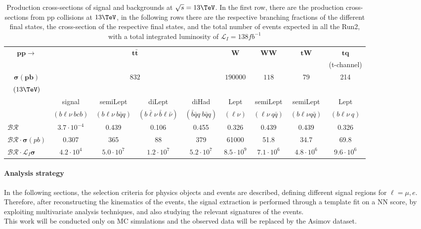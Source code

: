 \begin{table}[H]
    \centering
    \fontsize{9.2pt}{9.2pt}\selectfont
    \begin{tabular}{l|cccc|c|c|c|c}
        \toprule
          \multicolumn{1}{c|}{$\mathbf{pp\to}$}&\multicolumn{4}{c|}{$ \mathbf{t\bar{t}}$}&  $ \mathbf{W}$& $ \mathbf{WW}$ & $ \mathbf{tW}$& $ \mathbf{tq}$\\
          &&  &  &  &  &   & & (t-channel)\\
          \midrule
          \multicolumn{1}{c|}{$\mathbf{\sigma (pb)}$}&\multicolumn{4}{c|}{\multirow{2}{*}{$832$}}& \multirow{2}{*}{$190000$} & \multirow{2}{*}{$118$} &  \multirow{2}{*}{79}& \multirow{2}{*}{214} \\
          \multicolumn{1}{c|}{$(13\TeV)$}& &  & & &  &&&\\
          \midrule
          &signal&  semiLept&  diLept&  diHad& Lept &  semiLept & semiLept& Lept\\
          &$(b\ell \nu\: bcb)$&$(b\ell \nu\: b\bar{q}q)$&$(b\bar{\ell} \nu\: \bar{b}\ell \bar{\nu})$&$(\bar{b}\bar{q}q\: b\bar{q}q)$&$(\ell \nu)$&$(\ell \nu \: q\bar{q})$& $(b\ell\nu q \bar{q})$&$(b\ell\nu \: q)$\\
          \midrule
          $\mathcal{BR}$& $3.7 \cdot 10^{-4}$   & 0.439 & 0.106 & 0.455 & 0.326 & 0.439 & 0.439 & 0.326\\
          $ \mathcal{BR}\cdot\mathbf{\sigma} (pb)$& 0.307 & 365 & 88 & 379 & 61000 & 51.8 & 34.7& 69.8 \\
          $\mathcal{BR}\cdot\mathcal{L}_I\mathbf{\sigma} $&$4.2 \cdot 10^4$& $5.0 \cdot 10^7$ &  $1.2 \cdot 10^7$&$5.2 \cdot 10^7$  &  $8.5 \cdot 10^9$ & $7.1 \cdot 10^6$  & $4.8 \cdot 10^6$& $9.6 \cdot 10^{6}$\\
          \bottomrule
    \end{tabular}
    \vspace{0.2cm}
    \caption{Production cross-sections of signal and backgrounds at $\sqrt{s}=13\TeV$. In the first row, there are the production cross-sections from pp collisions at $13 \TeV$, in the following rows there are the respective branching fractions of the different final states, the cross-section of the respective final states, and the total number of events expected in all the Run2, with a total integrated luminosity of $\mathcal{L}_I=138 {fb}^{-1}$}
    \label{tab:cross}
\end{table}

\paragraph*{Analysis strategy}
In the following sections, the selection criteria for physics objects and events are described, defining different signal regions for $\ell=\mu,e$.
Therefore, after reconstructing the kinematics of the events, the signal extraction is performed through a template fit on a NN score, by exploiting multivariate analysis techniques, and also studying the relevant signatures of the events.\\
This work will be conducted only on MC simulations and the observed data will be replaced by the Asimov dataset.



